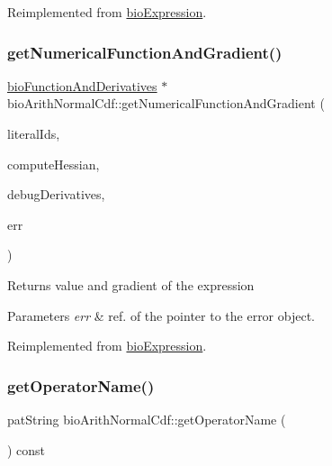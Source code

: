 Reimplemented from \hyperlink{classbio_expression_a3e4b4dca58dbbc6f0e411b30eb3f60b4}{bio\+Expression}.

\mbox{\label{classbio_arith_normal_cdf_ac482f8e85421635fd033018fd779ef88}} 
\subsubsection{\texorpdfstring{get\+Numerical\+Function\+And\+Gradient()}{getNumericalFunctionAndGradient()}}
{\footnotesize\ttfamily \hyperlink{classbio_function_and_derivatives}{bio\+Function\+And\+Derivatives} $\ast$ bio\+Arith\+Normal\+Cdf\+::get\+Numerical\+Function\+And\+Gradient (\begin{DoxyParamCaption}\item[{vector$<$ pat\+U\+Long $>$}]{literal\+Ids,  }\item[{pat\+Boolean}]{compute\+Hessian,  }\item[{pat\+Boolean}]{debug\+Derivatives,  }\item[{pat\+Error $\ast$\&}]{err }\end{DoxyParamCaption})\hspace{0.3cm}{\ttfamily [virtual]}}

\begin{DoxyReturn}{Returns}
value and gradient of the expression 
\end{DoxyReturn}

\begin{DoxyParams}{Parameters}
{\em err} & ref. of the pointer to the error object. \\
\hline
\end{DoxyParams}


Reimplemented from \hyperlink{classbio_expression_a91c81ce80c9e972c913b10f5f3c1ed13}{bio\+Expression}.

\mbox{\label{classbio_arith_normal_cdf_a5c5a2ee63e4df2a8ccbc117bf819e48b}} 
\subsubsection{\texorpdfstring{get\+Operator\+Name()}{getOperatorName()}}
{\footnotesize\ttfamily pat\+String bio\+Arith\+Normal\+Cdf\+::get\+Operator\+Name (\begin{DoxyParamCaption}{ }\end{DoxyParamCaption}) const\hspace{0.3cm}{\ttfamily [virtual]}}

